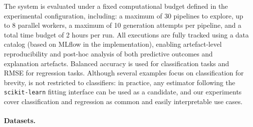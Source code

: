 \documentclass[runningheads]{llncs}
\begin{document}
The system is evaluated under a fixed computational budget defined in the experimental configuration, including:
a maximum of 30 pipelines to explore,
up to 8 parallel workers,
a maximum of 10 generation attempts per pipeline,
and a total time budget of 2 hours per run.
%
All executions are fully tracked using a data catalog (based on MLflow in the implementation),
enabling artefact-level reproducibility and post-hoc analysis of both predictive outcomes and explanation artefacts.
Balanced accuracy is used for classification tasks and RMSE for regression tasks.
Although several examples focus on classification for brevity, \ourapproach{} is not restricted to classifiers: 
in practice, any estimator following the \texttt{scikit-learn} fitting interface can be used as a candidate, 
and our experiments cover classification and regression as common and easily interpretable use cases.

\paragraph{Datasets.}
\label{subsubsec:datasets}


\end{document}
